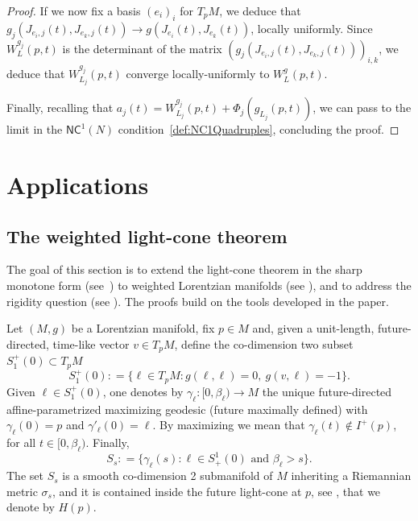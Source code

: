 \documentclass[12pt,a4paper]{amsart}
\theoremstyle{plain}
\theoremstyle{definition}
\numberwithin{equation}{section}
\newcommand{\NC}{\mathsf{NC}}
\begin{document}
\begin{proof}
  If we now fix a basis $(e_i)_i$ for $T_pM$, we deduce that
  $g_j(J_{e_i,j}(t),J_{e_k,j}(t))\to g(J_{e_i}(t),J_{e_k}(t))$,
  locally uniformly.
  Since $W_{L}^{g_j}(p,t)$ is the determinant of the matrix
  $(g_j(J_{e_i,j}(t),J_{e_k,j}(t)))_{i,k}$, we deduce that
  $W_{L_j}^{g_j}(p,t)$ converge locally-uniformly to $W_{L}^{g}(p,t)$.

  Finally, recalling that $a_j(t)= W_{L_j}^{g_j}(p,t)+\Phi_j(g_{L_j}(p,t))$,
  we can pass to the limit in the $\NC^{1}(N)$ condition~\eqref{def:NC1Quadruples}, concluding the
  proof.
\end{proof}


\section{Applications}\label{S:applications}

\subsection{The weighted light-cone theorem}\label{SS:WLCT}
The goal of this section is to extend the light-cone theorem in the sharp monotone form (see~\cite{CBCMG-2009, Grant}) to weighted 
Lorentzian manifolds (see ), and to address the rigidity question (see ). The proofs build on the tools developed in the paper.



Let $(M,g)$ be a Lorentzian manifold, fix $p\in M$ and, given a unit-length, future-directed, time-like vector $v \in T_pM$, 
define the co-dimension two subset $S^{+}_{1}(0) \subset T_p M$
%
$$
S^{+}_{1}(0) : = \{ \ell \in T_pM \colon g(\ell,\ell) = 0, \ 
g (v,\ell) = -1 \} .
$$
%
Given $\ell \in S^{+}_{1}(0)$, 
one denotes by 
$\gamma_\ell : [0, \beta_\ell) \to M$
the unique future-directed affine-parametrized maximizing geodesic  (future maximally defined) with 
$\gamma_\ell(0) = p$ and 
$\gamma'_\ell (0) = \ell$.
By maximizing we mean that 
$\gamma_{\ell}(t)\not\in I^{+}(p)$, for all $t\in[0,\beta_\ell)$.
%
Finally,
$$
S_s : = \{\gamma_\ell(s)\colon \ell \in S^1_+(0) \text{ and } \beta_\ell>s \}.
$$
The set $S_s$ is a smooth co-dimension 2 submanifold of $M$ inheriting a Riemannian metric $\sigma_s$, and 
 it is contained inside the future light-cone at $p$,
see , that we denote by $H(p)$. 
\end{document}
